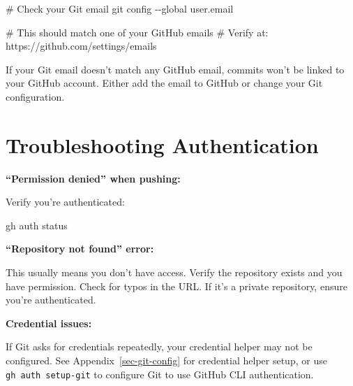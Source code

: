 \documentclass[
  letterpaper,
  DIV=11,
  numbers=noendperiod]{scrreprt}
\newenvironment{Shaded}{\begin{snugshade}}{\end{snugshade}}
\newcommand{\AttributeTok}[1]{\textcolor[rgb]{0.40,0.45,0.13}{#1}}
\newcommand{\CommentTok}[1]{\textcolor[rgb]{0.37,0.37,0.37}{#1}}
\newcommand{\ExtensionTok}[1]{\textcolor[rgb]{0.00,0.23,0.31}{#1}}
\newcommand{\FunctionTok}[1]{\textcolor[rgb]{0.28,0.35,0.67}{#1}}
\newcommand{\NormalTok}[1]{\textcolor[rgb]{0.00,0.23,0.31}{#1}}
\begin{document}
\begin{codelisting}

\caption{\texttt{terminal}}

\begin{Shaded}
\begin{Highlighting}[]
\CommentTok{\# Check your Git email}
\FunctionTok{git}\NormalTok{ config }\AttributeTok{{-}{-}global}\NormalTok{ user.email}

\CommentTok{\# This should match one of your GitHub emails}
\CommentTok{\# Verify at: https://github.com/settings/emails}
\end{Highlighting}
\end{Shaded}

\end{codelisting}

If your Git email doesn't match any GitHub email, commits won't be
linked to your GitHub account. Either add the email to GitHub or change
your Git configuration.

\section{Troubleshooting
Authentication}\label{troubleshooting-authentication}

\textbf{``Permission denied'' when pushing:}

Verify you're authenticated:

\begin{codelisting}

\caption{\texttt{terminal}}

\begin{Shaded}
\begin{Highlighting}[]
\ExtensionTok{gh}\NormalTok{ auth status}
\end{Highlighting}
\end{Shaded}

\end{codelisting}

\textbf{``Repository not found'' error:}

This usually means you don't have access. Verify the repository exists
and you have permission. Check for typos in the URL. If it's a private
repository, ensure you're authenticated.

\textbf{Credential issues:}

If Git asks for credentials repeatedly, your credential helper may not
be configured. See Appendix~\ref{sec-git-config} for credential helper
setup, or use \texttt{gh\ auth\ setup-git} to configure Git to use
GitHub CLI authentication.
\end{document}
